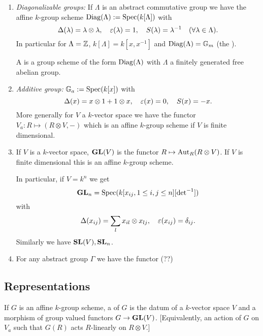 \begin{example} \leavevmode
	\begin{enumerate}[(1)]
		\item \emph{Diagonalizable groups:} If $\Lambda$ is an abstract commutative group we have the affine $k$-group scheme $\operatorname{Diag}(\Lambda):=\operatorname{Spec}(k[\Lambda])$ with
			\[
			\Delta(\lambda) = \lambda \otimes \lambda,\quad \varepsilon(\lambda)=1,\quad S(\lambda)=\lambda^{-1}\quad (\forall \lambda\in \Lambda).
			\] 
			In particular for $\Lambda=\mathbb Z$, $k[\Lambda]=k[x,x^{-1}]$ and $\operatorname{Diag}(\Lambda)=\mathbb{G}_m$ (the ).

			A  is a group scheme of the form $\operatorname{Diag}(\Lambda)$ with $\Lambda$ a finitely generated free abelian group.
		\item \emph{Additive group:} $\mathbb{G}_a:=\operatorname{Spec}(k[x])$ with
			\[
			\Delta(x) = x\otimes 1 + 1\otimes x,\quad \varepsilon(x)=0,\quad S(x)=-x.
			\]
			More generally for $V$ a $k$-vector space we have the functor $V_{a}:R\mapsto (R\otimes V,-)$ which is an affine $k$-group scheme if $V$ is finite dimensional.
		\item If $V$ is a $k$-vector space, $\mathbf{GL}(V)$ is the functor $R\mapsto \Aut_R(R\otimes V)$. If $V$ is finite dimensional this is an affine $k$-group scheme.

			In particular, if $V=k^{n}$ we get 
			\[
				\mathbf{GL}_n = \operatorname{Spec}(k[x_{ij},1\le i,j\le n][\operatorname{det}^{-1}])
			\] 
			with
			\[
			\Delta(x_{ij}) = \sum_l x_{il}\otimes x_{lj},\quad \varepsilon(x_{ij}) = \delta_{ij}
			.\] 
			Similarly we have $\mathbf{SL}(V), \mathbf{SL}_n$.
		\item For any abstract group $\Gamma$ we have the functor (??)
	\end{enumerate}
\end{example}

\subsection{Representations}

If $G$ is an affine $k$-group scheme, a  of $G$ is the datum of a $k$-vector space $V$ and a morphism of group valued functors $G\to \GL(V)$. [Equivalently, an action of $G$ on $V_{a}$ such that $G(R)$ acts $R$-linearly on $R\otimes V$.]

